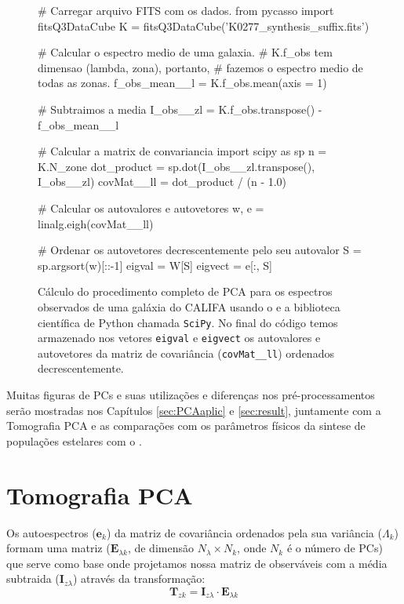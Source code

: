 \begin{figure}
	\begin{python}
# Carregar arquivo FITS com os dados.
from pycasso import fitsQ3DataCube
K = fitsQ3DataCube('K0277_synthesis_suffix.fits')

# Calcular o espectro medio de uma galaxia. 
# K.f_obs tem dimensao (lambda, zona), portanto, 
# fazemos o espectro medio de todas as zonas.
f_obs_mean__l = K.f_obs.mean(axis = 1)

# Subtraimos a media
I_obs__zl = K.f_obs.transpose() - f_obs_mean__l

# Calcular a matrix de convariancia
import scipy as sp
n = K.N_zone
dot_product = sp.dot(I_obs__zl.transpose(), I_obs__zl)
covMat__ll = dot_product / (n - 1.0)   

# Calcular os autovalores e autovetores
w, e = linalg.eigh(covMat__ll)

# Ordenar os autovetores decrescentemente pelo seu autovalor
S = sp.argsort(w)[::-1]
eigval = W[S]
eigvect = e[:, S]
	\end{python}
	\caption[Exemplo de cálculo de PCA usando o \pycasso e SciPy.] 
	{Cálculo do procedimento completo de PCA para os espectros observados de uma galáxia do CALIFA usando o \pycasso e a
	biblioteca científica de Python chamada \texttt{SciPy}. No final do código temos armazenado nos vetores \texttt{eigval}
	e \texttt{eigvect} os autovalores e autovetores da matriz de covariância (\texttt{covMat\_\_ll}) ordenados
	decrescentemente.}
	\label{fig:programaCovMatrix}
\end{figure}

Muitas figuras de PCs e suas utilizações e diferenças nos pré-processamentos serão mostradas nos Capítulos
\ref{sec:PCAaplic} e \ref{sec:result}, juntamente com a Tomografia PCA e as comparações com os parâmetros físicos da
sintese de populações estelares com o \starlight.


\section{Tomografia PCA}
\label{sec:PCAeTomoPCA:TomoPCA}

Os autoespectros ($\mathbf{e}_k$) da matriz de covariância ordenados pela sua variância ($\Lambda_k$) formam uma matriz
($\mathbf{E}{}_{\lambda k}$, de dimensão $N_\lambda \times N_k$, onde $N_k$ é o número de PCs) que serve como base onde
projetamos nossa matriz de observáveis com a média subtraida ($\mathbf{I}{}_{z \lambda}$) através da transformação:
\begin{equation}
	\label{eq:TomoPCA:tomogram2D}
	\mathbf{T}{}_{z k} = \mathbf{I}{}_{z \lambda} \cdot \mathbf{E}{}_{\lambda k}
\end{equation}

